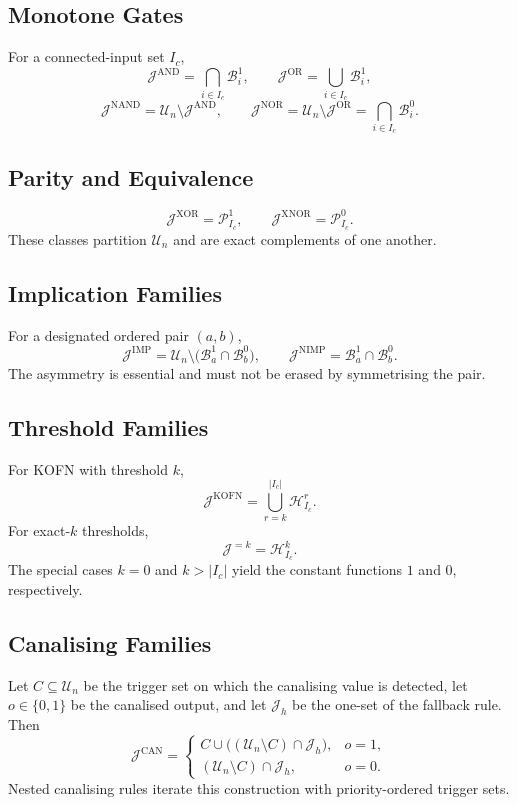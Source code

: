 \documentclass[11pt]{article}
\theoremstyle{definition}
\newcommand{\U}{\mathcal{U}_n}
\newcommand{\Ic}{I_c}
\newcommand{\J}{\mathcal{J}}
\newcommand{\Band}[2]{\mathcal{B}_{#1}^{#2}}
\newcommand{\Parity}[2]{\mathcal{P}_{#1}^{#2}}
\newcommand{\Weight}[2]{\mathcal{H}_{#1}^{#2}}
\newcommand{\bits}{\{0,1\}}
\begin{document}
\subsection{Monotone Gates}
For a connected-input set \(\Ic\),
\[
\J^{\mathrm{AND}}=\bigcap_{i\in\Ic}\Band{i}{1},
\qquad
\J^{\mathrm{OR}}=\bigcup_{i\in\Ic}\Band{i}{1},
\]
\[
\J^{\mathrm{NAND}}=\U\setminus\J^{\mathrm{AND}},
\qquad
\J^{\mathrm{NOR}}=\U\setminus\J^{\mathrm{OR}}=\bigcap_{i\in\Ic}\Band{i}{0}.
\]

\subsection{Parity and Equivalence}
\[
\J^{\mathrm{XOR}}=\Parity{\Ic}{1},
\qquad
\J^{\mathrm{XNOR}}=\Parity{\Ic}{0}.
\]
These classes partition \(\U\) and are exact complements of one another.

\subsection{Implication Families}
For a designated ordered pair \((a,b)\),
\[
\J^{\mathrm{IMP}}=\U\setminus\bigl(\Band{a}{1}\cap\Band{b}{0}\bigr),
\qquad
\J^{\mathrm{NIMP}}=\Band{a}{1}\cap\Band{b}{0}.
\]
The asymmetry is essential and must not be erased by symmetrising the pair.

\subsection{Threshold Families}
For KOFN with threshold \(k\),
\[
\J^{\mathrm{KOFN}}=\bigcup_{r=k}^{|\Ic|}\Weight{\Ic}{r}.
\]
For exact-\(k\) thresholds,
\[
\J^{=k}=\Weight{\Ic}{k}.
\]
The special cases \(k=0\) and \(k>|\Ic|\) yield the constant functions \(1\) and \(0\), respectively.

\subsection{Canalising Families}
Let \(C\subseteq\U\) be the trigger set on which the canalising value is detected, let \(o\in\bits\) be the canalised output, and let \(\J_h\) be the one-set of the fallback rule. Then
\[
\J^{\mathrm{CAN}}
=
\begin{cases}
C\cup\bigl((\U\setminus C)\cap \J_h\bigr), & o=1,\\[4pt]
(\U\setminus C)\cap \J_h, & o=0.
\end{cases}
\]
Nested canalising rules iterate this construction with priority-ordered trigger sets.
\end{document}
